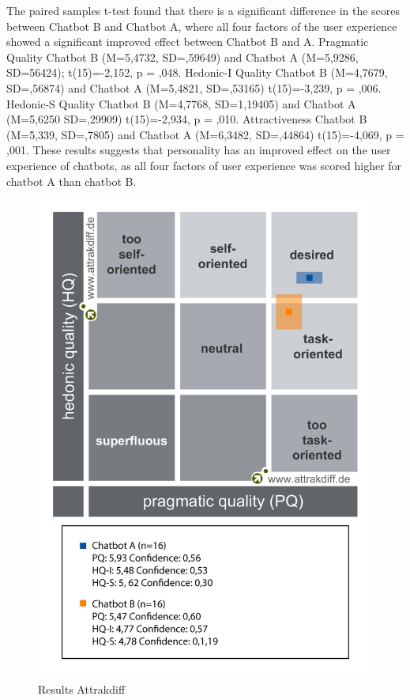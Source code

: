 The paired samples t-test found that there is a significant difference in the scores between Chatbot B and Chatbot A, where all four factors of the user experience showed a significant improved effect between Chatbot B and A. Pragmatic Quality Chatbot B (M=5,4732, SD=,59649) and Chatbot A (M=5,9286, SD=56424); t(15)=-2,152, p = ,048. Hedonic-I Quality Chatbot B (M=4,7679, SD=,56874) and Chatbot A (M=5,4821, SD=,53165) t(15)=-3,239, p = ,006. Hedonic-S Quality Chatbot B (M=4,7768, SD=1,19405) and Chatbot A (M=5,6250 SD=,29909) t(15)=-2,934, p = ,010. Attractiveness Chatbot B (M=5,339, SD=,7805) and Chatbot A (M=6,3482, SD=,44864) t(15)=-4,069, p = ,001. These results suggests that personality has an improved effect on the user experience of chatbots, as all four factors of user experience was scored higher for chatbot A than chatbot B.

\begin{figure}[h]
    \centering
    \includegraphics[scale=0.4]{figures/Portfolio-of-results-attrakdiff.png}
    \caption{Results Attrakdiff}
    \label{fig:portres}
\end{figure}
        
